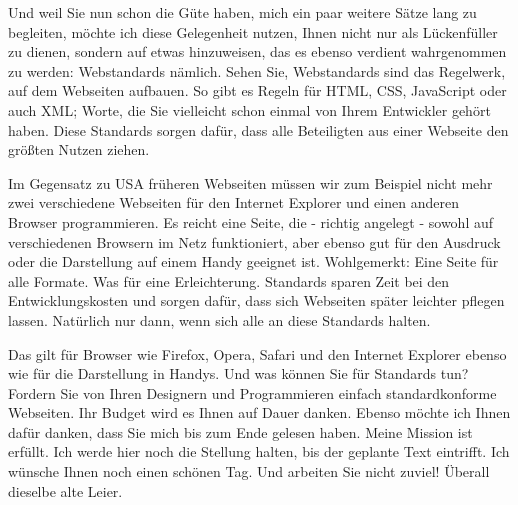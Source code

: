 Und weil Sie nun schon die Güte haben, mich ein paar weitere Sätze lang zu begleiten, möchte ich diese Gelegenheit nutzen, Ihnen nicht nur als Lückenfüller zu dienen, sondern auf etwas hinzuweisen, das es ebenso verdient wahrgenommen zu werden: Webstandards nämlich. Sehen Sie, Webstandards sind das Regelwerk, auf dem Webseiten aufbauen. So gibt es Regeln für HTML, CSS, JavaScript oder auch XML; Worte, die Sie vielleicht schon einmal von Ihrem Entwickler gehört haben. Diese Standards sorgen dafür, dass alle Beteiligten aus einer Webseite den größten Nutzen ziehen.

Im Gegensatz zu \ac{USA} früheren Webseiten müssen wir zum Beispiel nicht mehr zwei verschiedene Webseiten für den Internet Explorer und einen anderen Browser programmieren. Es reicht eine Seite, die - richtig angelegt - sowohl auf verschiedenen Browsern im Netz funktioniert, aber ebenso gut für den Ausdruck oder die Darstellung auf einem Handy geeignet ist. Wohlgemerkt: Eine Seite für alle Formate. Was für eine Erleichterung. Standards sparen Zeit bei den Entwicklungskosten und sorgen dafür, dass sich Webseiten später leichter pflegen lassen. Natürlich nur dann, wenn sich alle an diese Standards halten.

Das gilt für Browser wie Firefox, Opera, Safari und den Internet Explorer ebenso wie für die Darstellung in Handys. Und was können Sie für Standards tun? Fordern Sie von Ihren Designern und Programmieren einfach standardkonforme Webseiten. Ihr Budget wird es Ihnen auf Dauer danken. Ebenso möchte ich Ihnen dafür danken, dass Sie mich bis zum Ende gelesen haben. Meine Mission ist erfüllt. Ich werde hier noch die Stellung halten, bis der geplante Text eintrifft. Ich wünsche Ihnen noch einen schönen Tag. Und arbeiten Sie nicht zuviel! Überall dieselbe alte Leier.

\pagebreak